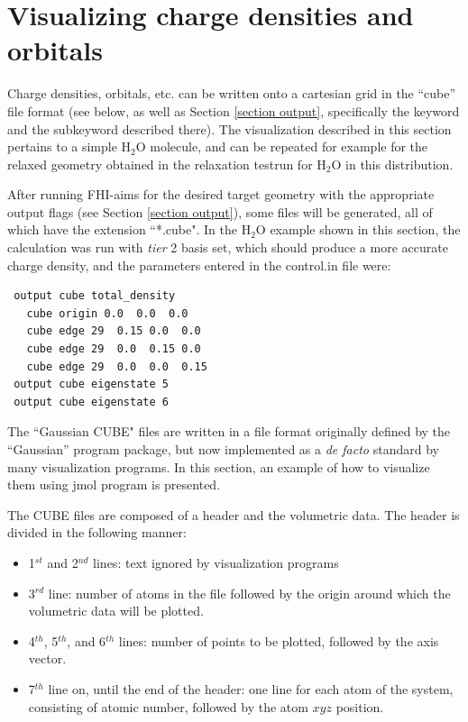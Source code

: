 \section{Visualizing charge densities and orbitals}
\label{section visualizing}

Charge densities, orbitals, etc. can be written onto a cartesian grid
in the ``cube'' file format (see below, as well as Section
\ref{section output}, specifically the  keyword and
the  subkeyword described there). The
visualization described in this section pertains to a simple H$_2$O
molecule, and can be repeated for example for the relaxed geometry
obtained in the relaxation testrun for H$_2$O in this distribution.

After running FHI-aims for the desired target geometry with the
appropriate output flags (see Section \ref{section output}), some
files will be generated, all of which have the extension ``*.cube". In
the H$_2$O example shown in this section, the calculation was run with
\emph{tier} 2 basis set, which should produce a more accurate charge
density, and the parameters entered in the control.in 
file were: 

\begin{verbatim}
 output cube total_density
   cube origin 0.0  0.0  0.0
   cube edge 29  0.15 0.0  0.0
   cube edge 29  0.0  0.15 0.0
   cube edge 29  0.0  0.0  0.15
 output cube eigenstate 5
 output cube eigenstate 6
\end{verbatim}

The ``Gaussian CUBE" files are written in a file format originally
defined by the ``Gaussian'' program package, but now implemented as a
\emph{de facto} standard by many visualization programs. In this
section, an example of how to visualize them using jmol program
\cite{jmol} is presented.  

The CUBE files are composed of a header and the volumetric data. The
header is divided in the following manner: 

\begin{itemize}
\item 1$^{st}$ and 2$^{nd}$ lines: text ignored by visualization programs
\item 3$^{rd}$ line:  number of atoms in the file followed by the origin around which the volumetric data will be plotted.
\item 4$^{th}$, 5$^{th}$, and 6$^{th}$ lines: number of points to be plotted, followed by the axis vector.
\item 7$^{th}$ line on, until the end of the header: one line for each atom of the system, consisting of atomic number, followed by the atom $xyz$ position.
\end{itemize}

